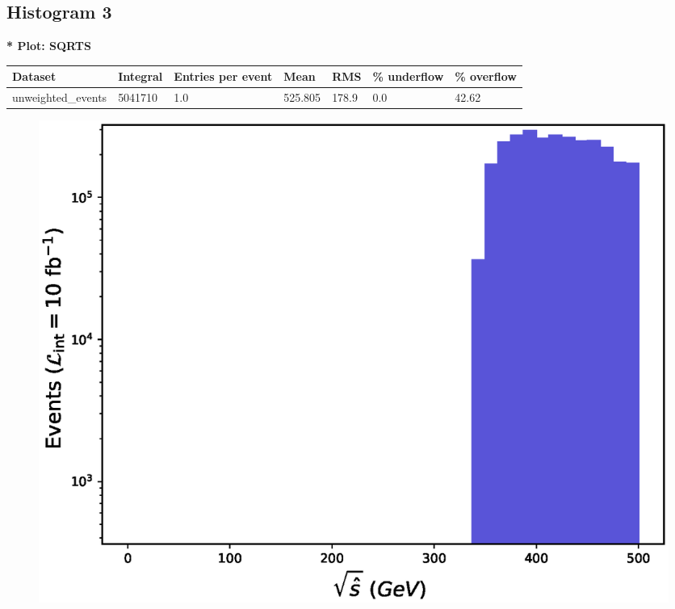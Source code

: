 \documentclass[a4paper, 10pt]{article}
\begin{document}
\subsection{ Histogram 3}

\textbf{* Plot: SQRTS}\\
   \begin{table}[H]
  \begin{center}
    \begin{tabular}{|m{23.0mm}|m{23.0mm}|m{18.0mm}|m{19.0mm}|m{19.0mm}|m{19.0mm}|m{19.0mm}|}
      \hline
      {\cellcolor{yellow}         Dataset}& {\cellcolor{yellow}         Integral}& {\cellcolor{yellow}         Entries per event}& {\cellcolor{yellow}         Mean}& {\cellcolor{yellow}         RMS}& {\cellcolor{yellow}         \% underflow}& {\cellcolor{yellow}         \% overflow}\\
      \hline
      {\cellcolor{white}         unweighted\_events}& {\cellcolor{white}         5041710}& {\cellcolor{white}         1.0}& {\cellcolor{white}         525.805}& {\cellcolor{white}         178.9}& {\cellcolor{red}         0.0}& {\cellcolor{red}         42.62}\\
\hline
    \end{tabular}
  \end{center}
\end{table}

\begin{figure}[H]
  \begin{center}
    \includegraphics[scale=0.45]{selection_2.eps}\\
\caption{   }
  \end{center}
\end{figure}
      \newpage
\end{document}
